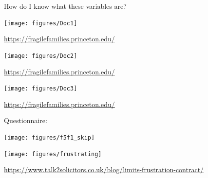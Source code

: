 \documentclass[aspectratio=169]{beamer}
\begin{document}
%
\begin{frame}

How do I know what these variables are? 

\end{frame}
\begin{frame}

\centering\texttt{[image: figures/Doc1]}

\vfill
\url{https://fragilefamilies.princeton.edu/}

\end{frame}
\begin{frame}

\begin{center}
\texttt{[image: figures/Doc2]}
\end{center}

\vfill
\url{https://fragilefamilies.princeton.edu/}

\end{frame}
\begin{frame}

\begin{center}
\texttt{[image: figures/Doc3]}
\end{center}

\vfill
\url{https://fragilefamilies.princeton.edu/}
\end{frame}
\begin{frame}

Questionnaire:\\
\begin{center}
\texttt{[image: figures/f5f1\_skip]}
\end{center}

\end{frame}
\begin{frame}

\begin{center}
\texttt{[image: figures/frustrating]}
\end{center}

\vfill
\tiny{\url{https://www.talk2solicitors.co.uk/blog/limits-frustration-contract/}}

\end{frame}
\end{document}
